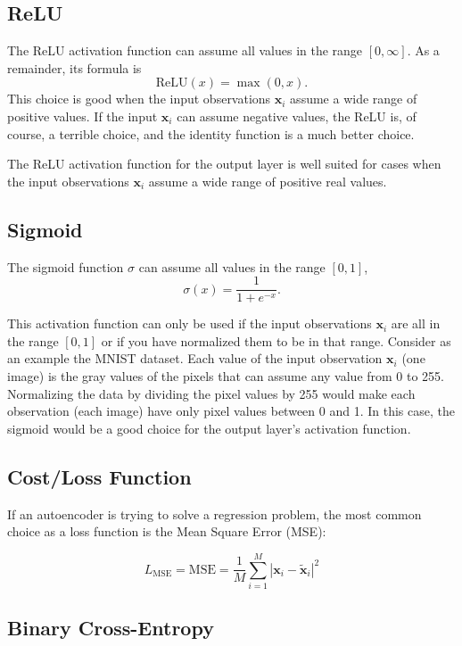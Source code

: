\documentclass[%
oneside,                 %
final,                   %
10pt]{article}
\begin{document}
\subsection{ReLU}

The  ReLU activation function can assume all values in the range $\left[0,\infty\right]$. As a remainder, its formula is
\[
\textrm{ReLU}\left(x\right) = \max\left(0,x\right).
\]
This choice is good when the input observations \(\mathbf{x}_{i}\) assume a wide range of positive values.
If the input $\mathbf{x}_{i}$ can assume negative values, the ReLU is, of course, a terrible choice, and the identity function is a much better choice.

The ReLU activation function for the output layer is well suited for cases when the input observations \(\mathbf{x}_{i}\) assume a wide range of positive real values.

\subsection{Sigmoid}

The sigmoid function $\sigma$ can assume all values in the range $[0,1]$,
\[
\sigma\left(x\right) =\frac{1}{1+e^{-x}}.
\]

This activation function can only be used if the input observations
$\mathbf{x}_{i}$ are all in the range $[0,1]$  or if you have
normalized them to be in that range. Consider as an example the MNIST
dataset. Each value of the input observation $\mathbf{x}_{i}$ (one
image) is the gray values of the pixels that can assume any value from
0 to 255. Normalizing the data by dividing the pixel values by 255
would make each observation (each image) have only pixel values
between 0 and 1. In this case, the sigmoid would be a good choice for
the output layer's activation function.

\subsection{Cost/Loss Function}

If an autoencoder is trying to solve a regression problem, the most
common choice as a loss function is the Mean Square Error (MSE):

\[
L_{\textrm{MSE}} = \textrm{MSE} = \frac{1}{M}\sum_{i = 1}^{M}\left\vert\mathbf{x}_{i}-\tilde{\mathbf{x}}_{i}\right\vert^{2}
\]

\subsection{Binary Cross-Entropy}
\end{document}
